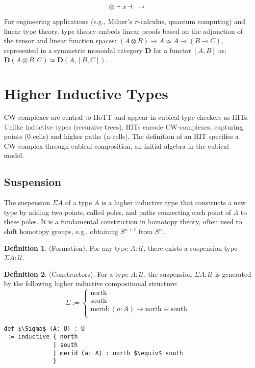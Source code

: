 \documentclass{article}
\theoremstyle{definition}
\newtheorem{definition}{Definition}
\begin{document}
$$
\otimes \dashv x \dashv\ \multimap
$$

For engineering applications (e.g., Milner's $\pi$-calculus, quantum computing)
and linear type theory, type theory embeds linear proofs based on the adjunction
of the tensor and linear function spaces: $(A \otimes B) \multimap A \simeq A \multimap (B \multimap C)$,
represented in a symmetric monoidal category $\mathbf{D}$ for a functor $[A,B]$ as:
$\mathbf{D}(A \otimes B, C) \simeq \mathbf{D}(A, [B,C])$.

\section{Higher Inductive Types}
CW-complexes are central to HoTT and appear in cubical type checkers as HITs.
Unlike inductive types (recursive trees), HITs encode CW-complexes, capturing
points (0-cells) and higher paths (n-cells). The definition of an HIT specifies a CW-complex
through cubical composition, an initial algebra in the cubical model.

\newpage
\subsection{Suspension}
The suspension \(\Sigma A\) of a type \( A \) is a higher inductive type that
constructs a new type by adding two points, called poles, and paths connecting
each point of \( A \) to these poles. It is a fundamental construction in homotopy theory,
often used to shift homotopy groups, e.g., obtaining \( S^{n+1} \) from \( S^n \).

\begin{definition} (Formation).
For any type \( A : \mathcal{U} \), there exists a suspension type \( \Sigma A : \mathcal{U} \).
\end{definition}

\begin{definition} (Constructors).
For a type \( A : \mathcal{U} \), the suspension \( \Sigma A : \mathcal{U} \)
is generated by the following higher inductive compositional structure:
\[
\Sigma :=
\begin{cases}
\text{north} \\
\text{south} \\
\text{merid} : (a : A) \rightarrow \text{north} \equiv \text{south} \\
\end{cases}
\]
\begin{lstlisting}[mathescape=true]
def $\Sigma$ (A: U) : U
 := inductive { north
              | south
              | merid (a: A) : north $\equiv$ south
              }
\end{lstlisting}
\end{definition}
\end{document}
